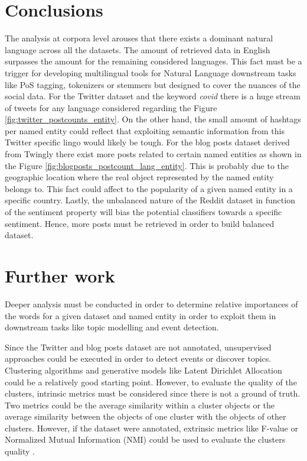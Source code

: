 \section{Conclusions}


The analysis at corpora level arouses that there exists a dominant natural language across all the datasets. The amount of retrieved data in English surpasses the amount for the remaining considered languages. This fact must be a trigger for developing multilingual tools for Natural Language downstream tasks like PoS tagging, tokenizers or stemmers but designed to cover the nuances of the social data. For the Twitter dataset and the keyword \textit{covid} there is a huge stream of tweets for any language considered regarding the Figure \ref{fig:twitter_postcounts_entity}. On the other hand, the small amount of hashtags per named entity could reflect that exploiting semantic information from this Twitter specific lingo would likely be tough. For the blog posts dataset derived from Twingly there exist more posts related to certain named entities as shown in the Figure \ref{fig:blogposts_postcount_lang_entity}. This is probably due to the geographic location where the real object represented by the named entity belongs to. This fact could affect to the popularity of a given named entity in a specific country. Lastly, the unbalanced nature of the Reddit dataset in function of the sentiment property will bias the potential classifiers towards a specific sentiment. Hence, more posts must be retrieved in order to build balanced dataset.


\section{Further work}
Deeper analysis must be conducted in order to determine relative importances of the words for a given dataset and named entity in order to exploit them in downstream tasks like topic modelling and event detection.
\par Since the Twitter and blog posts dataset are not annotated, unsupervised approaches could be executed in order to detect events or discover topics. Clustering algorithms and generative models like Latent Dirichlet Allocation \citep{Blei2003} could be a relatively good starting point. However, to evaluate the quality of the clusters, intrinsic metrics must be considered since there is not a ground of truth. Two metrics could be the average similarity within a cluster objects or the average similarity between the objects of one cluster with the objects of other clusters. However, if the dataset were annotated, extrinsic metrics like F-value or Normalized Mutual Information (NMI) could be used to evaluate the clusters quality \citep{clusteringTopicModellingTwitterReddit}.
